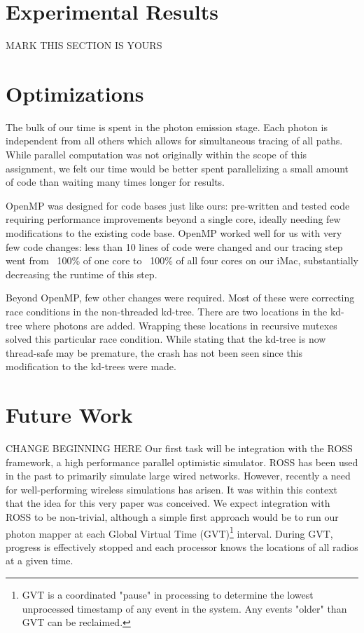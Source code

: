 \documentclass[%
        final,
        notitlepage,
        narroweqnarray,
        inline,
        twoside,
        ]{ieee}
\begin{document}
\section{Experimental Results}
MARK THIS SECTION IS YOURS

\section{Optimizations}
The bulk of our time is spent in the photon emission stage.  Each photon is
independent from all others which allows for simultaneous tracing of all
paths.  While parallel computation was not originally within the scope of this
assignment, we felt our time would be better spent parallelizing a small amount
of code than waiting many times longer for results.

OpenMP \cite{Grama} was designed for code bases just like ours: pre-written and
tested code requiring performance improvements beyond a single core, ideally
needing few modifications to the existing code base.  OpenMP worked well for
us with very few code changes: less than 10 lines of code were changed and
our tracing step went from ~100\% of one core to ~100\% of all four cores on
our iMac, substantially decreasing the runtime of this step.

Beyond OpenMP, few other changes were required.  Most of these were correcting
race conditions in the non-threaded kd-tree.  There are two locations in the
kd-tree where photons are added.  Wrapping these locations in recursive
mutexes solved this particular race condition.  While stating that the kd-tree
is now thread-safe may be premature, the crash has not been seen since this
modification to the kd-trees were made.

\section{Future Work}

CHANGE BEGINNING HERE
Our first task will be integration with the ROSS \cite{ross} framework, a high
performance parallel optimistic simulator.  ROSS has been used in the past to
primarily simulate large wired networks.  However, recently a need for
well-performing wireless simulations has arisen.  It was within this context
that the idea for this very paper was conceived.  We expect integration with
ROSS to be non-trivial, although a simple first approach would be to run our
photon mapper at each Global Virtual Time (GVT)\footnote{GVT is a coordinated
"pause" in processing to determine the lowest unprocessed timestamp of any
event in the system.  Any events "older" than GVT can be reclaimed.} interval.
During GVT, progress is effectively stopped and each processor knows the
locations of all radios at a given time.
\end{document}
